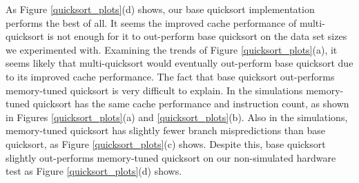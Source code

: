\documentclass[acmtocl]{acmtrans2m}
\begin{document}
As Figure \ref{quicksort_plots}(d) shows, our base quicksort implementation performs the best of all. It seems the improved cache performance of
multi-quicksort is not enough for it to out-perform base quicksort on the data set sizes we experimented with. Examining the trends of 
Figure \ref{quicksort_plots}(a), it seems likely that multi-quicksort would eventually out-perform base quicksort due to its improved cache performance.
The fact that base quicksort out-performs memory-tuned quicksort is very difficult to explain. In the simulations memory-tuned quicksort has the same
cache performance and instruction count, as shown in Figures \ref{quicksort_plots}(a) and \ref{quicksort_plots}(b). Also in the simulations, 
memory-tuned quicksort has slightly fewer branch mispredictions than base quicksort, as Figure \ref{quicksort_plots}(c) shows. Despite this, base 
quicksort slightly out-performs memory-tuned quicksort on our non-simulated hardware test as Figure \ref{quicksort_plots}(d) shows.
\end{document}
